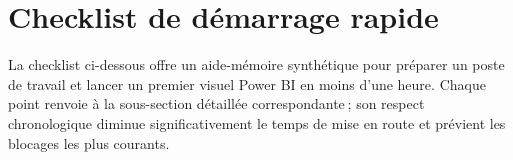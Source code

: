 
\section{Checklist de démarrage rapide}\label{sec:ch4_checklist}

La checklist ci-dessous offre un aide-mémoire synthétique pour préparer un poste de travail et lancer un premier visuel Power BI en moins d’une heure. Chaque point renvoie à la sous-section détaillée correspondante ; son respect chronologique diminue significativement le temps de mise en route et prévient les blocages les plus courants.


